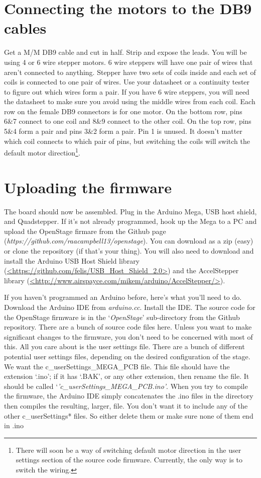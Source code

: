 \documentclass[11pt]{report} %
\begin{document}
\clearpage

\section{Connecting the motors to the DB9 cables}
Get a M/M DB9 cable and cut in half. Strip and expose the leads. You will be using 4 or 6 wire stepper motors. 6 wire steppers will have one pair of wires that aren't connected to anything. Stepper have two sets of coils inside and each set of coils is connected to one pair of wires. Use your datasheet or a continuity tester to figure out which wires form a pair. If you have 6 wire steppers, you will need the datasheet to make sure you avoid using the middle wires from each coil. Each row on the female DB9 connectors is for one motor. On the bottom row, pins 6\&7 connect to one coil and 8\&9 connect to the other coil. On the top row, pins 5\&4 form a pair and pins 3\&2 form a pair. Pin 1 is unused. It doesn't matter which coil connects to which pair of pins, but switching the coils will switch the default motor direction\footnote{There will soon be a way of switching default motor direction in the user settings section of the source code firmware. Currently, the only way is to switch the wiring.}.



\section{Uploading the firmware}
The board should now be assembled. Plug in the Arduino Mega, USB host shield, and Quadstepper. If it's not already programmed, hook up the Mega to a PC and upload the OpenStage firmare from the Github page (\textit{https://github.com/raacampbell13/openstage}). You can download as a zip (easy) or clone the repository (if that's your thing). You will also need to download and install the Arduino USB Host Shield library (\url{<https://github.com/felis/USB_Host_Shield_2.0>}) and the AccelStepper library (\url{<http://www.airspayce.com/mikem/arduino/AccelStepper/>}).

If you haven't programmed an Arduino before, here's what you'll need to do. Download the Arduino IDE from \textit{arduino.cc}. Install the IDE. The source code for the OpenStage firmware is in the `\textit{OpenStage}' sub-directory from the Github repository. There are a bunch of source code files here. Unless you want to make significant changes to the firmware, you don't need to be concerned with most of this. All you care about is the user settings file. There are a bunch of different potential user settings files, depending on the desired configuration of the stage. We want the c\_userSettings\_MEGA\_PCB file. This file should have the extension `.ino'; if it has `.BAK', or any other extension, then rename the file. It should be called `\textit{'c\_userSettings\_MEGA\_PCB.ino'}. When you try to compile the firmware, the Arduino IDE simply concatenates the .ino files in the directory then compiles the resulting, larger, file. You don't want it to include any of the other c\_userSettings* files. So either delete them or make sure none of them end in .ino 
\end{document}
